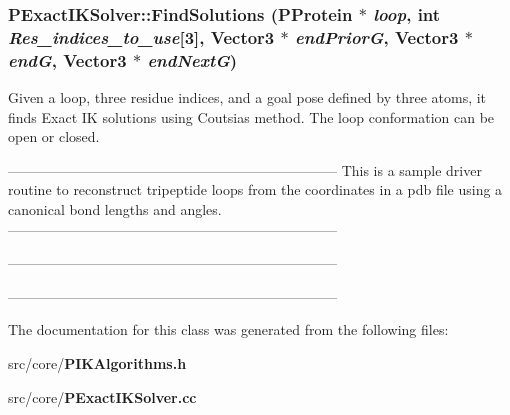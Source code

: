 \subsubsection{ PExact\-IKSolver::Find\-Solutions ({\bf PProtein} $\ast$ {\em loop}, int {\em Res\_\-indices\_\-to\_\-use}[3], Vector3 $\ast$ {\em end\-Prior\-G}, Vector3 $\ast$ {\em end\-G}, Vector3 $\ast$ {\em end\-Next\-G})\hspace{0.3cm}{\tt  [static]}}\label{classPExactIKSolver_ab96f8318d551dd1131795be4c39c5de}


Given a loop, three residue indices, and a goal pose defined by three atoms, it finds Exact IK solutions using Coutsias method. The loop conformation can be open or closed. 

----------------------------------------------------------------------- This is a sample driver routine to reconstruct tripeptide loops from the coordinates in a pdb file using a canonical bond lengths and angles. -----------------------------------------------------------------------

-----------------------------------------------------------------------

----------------------------------------------------------------------- 

The documentation for this class was generated from the following files:\begin{CompactItemize}
\item 
src/core/{\bf PIKAlgorithms.h}\item 
src/core/{\bf PExact\-IKSolver.cc}\end{CompactItemize}
